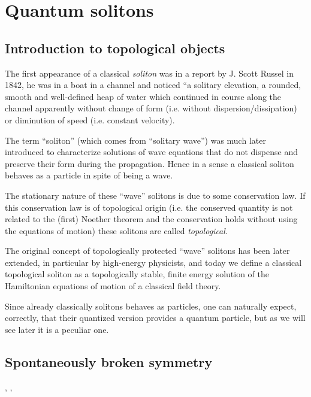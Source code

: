 \documentclass[../main/main.tex]{subfiles}
\begin{document}

\chapter{Quantum solitons}

\section{Introduction to topological objects}

The first appearance of a classical \emph{soliton} was in a report by J. Scott Russel in 1842, he was in a boat in a channel and noticed ``a solitary elevation, a rounded, smooth and well-defined heap of water which continued in course along the channel apparently without change of form (i.e. without dispersion/dissipation) or diminution of speed (i.e. constant velocity). 

The term ``soliton'' (which comes from ``solitary wave'') was much later introduced to characterize solutions of wave equations that do not dispense and preserve their form during the propagation. Hence in a sense a classical soliton behaves as a particle in spite of being a wave. 

The stationary nature of these ``wave'' solitons is due to some conservation law. If this conservation law is of topological origin (i.e. the conserved quantity is not related to the (first) Noether theorem and the conservation holds without using the equations of motion) these solitons are called \emph{topological}. 

The original concept of topologically protected ``wave'' solitons has been later extended, in particular by high-energy physicists, and today we define a classical topological soliton as a topologically stable, finite energy solution of the Hamiltonian equations of motion of a classical field theory. 

Since already classically solitons behaves as particles, one can naturally expect, correctly, that their quantized version provides a quantum particle, but as we will see later it is a peculiar one. 

\section{Spontaneously broken symmetry}\label{sec:SSB}

\cite[Chapter C.1]{Strocchi_1985}, \cite{Strocchi:2012}, \cite[Chapter 1]{Shifman:2012}\\
\end{document}
